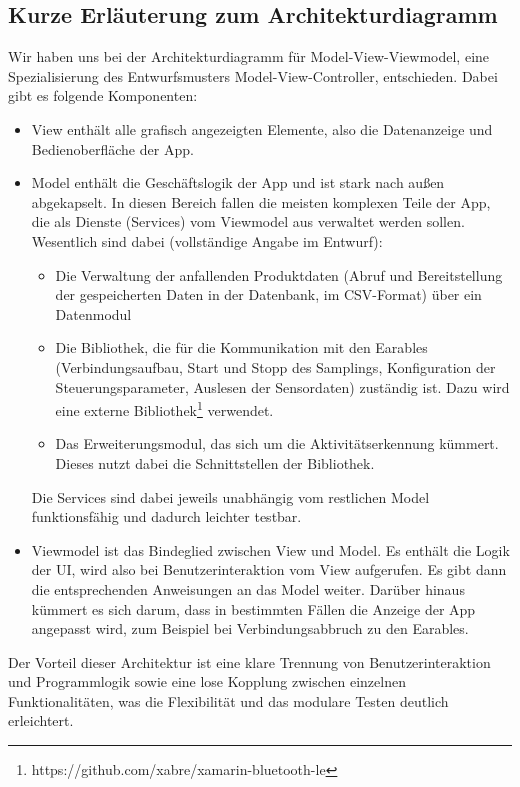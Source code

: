 \documentclass[a4paper,12pt]{article}
\begin{document}
  \subsection{Kurze Erläuterung zum Architekturdiagramm}
  Wir haben uns bei der Architekturdiagramm für \textsf{Model-View-Viewmodel}, eine Spezialisierung  des Entwurfsmusters Model-View-Controller, entschieden.
  Dabei gibt es folgende Komponenten:
  \begin{itemize}
    \item \textsf{\glqq View\grqq{}} enthält alle grafisch angezeigten Elemente, also die Datenanzeige und Bedienoberfläche der App.
    \item {\textsf{\glqq Model\grqq{}} enthält die Geschäftslogik der App und ist stark nach außen abgekapselt. In diesen Bereich fallen die meisten komplexen Teile der App, die als Dienste (Services) vom Viewmodel aus verwaltet werden sollen. Wesentlich sind dabei (vollständige Angabe im Entwurf): \begin{itemize}
      \item Die Verwaltung der anfallenden Produktdaten (Abruf und Bereitstellung der gespeicherten Daten in der Datenbank, im CSV-Format) über ein Datenmodul
      \item Die Bibliothek, die für die Kommunikation mit den \Gls{Earables} (Verbindungsaufbau, Start und Stopp des Samplings, Konfiguration der \Gls{Steuerungsparameter}, Auslesen der Sensordaten) zuständig ist. Dazu wird eine externe Bibliothek\footnote{https://github.com/xabre/xamarin-bluetooth-le} verwendet.
      \item Das Erweiterungsmodul, das sich um die Aktivitätserkennung kümmert. Dieses nutzt dabei die Schnittstellen der Bibliothek.
    \end{itemize}
    Die Services sind dabei jeweils unabhängig vom restlichen Model funktionsfähig und dadurch leichter testbar.}
    \item \textsf{\glqq Viewmodel\grqq{}} ist das Bindeglied zwischen View und Model. Es enthält die Logik der UI, wird also bei Benutzerinteraktion vom View aufgerufen. Es gibt dann die entsprechenden Anweisungen an das Model weiter. Darüber hinaus kümmert es sich darum, dass in bestimmten Fällen die Anzeige der App angepasst wird, zum Beispiel bei Verbindungsabbruch zu den \Gls{Earables}. 
    
  \end{itemize}
  Der Vorteil dieser Architektur ist eine klare Trennung von Benutzerinteraktion und Programmlogik sowie eine lose Kopplung zwischen einzelnen Funktionalitäten, was die Flexibilität und das modulare Testen deutlich erleichtert.
\end{document}
